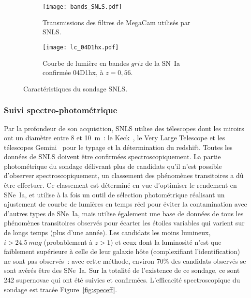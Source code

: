 \documentclass[../main/main.tex]{subfiles}
\begin{document}
\begin{figure}[ht]
    \centering
    \begin{subfigure}[]{.49\linewidth}
        \centering
        \texttt{[image: bands\_SNLS.pdf]}
        \captionsetup{justification=centering}
        \caption{Transmissions des filtres de MegaCam utilisés par SNLS.}
        \label{fig:snlsbands}
    \end{subfigure}
    \begin{subfigure}[]{.49\linewidth}
        \centering
        \texttt{[image: lc\_04D1hx.pdf]}
        \captionsetup{justification=centering}
        \caption{Courbe de lumière en bandes $griz$ de la SN~Ia confirmée
        04D1hx, à $z = 0,56$.}
        \label{fig:snlslc}
    \end{subfigure}
    \caption{Caractéristiques du sondage SNLS.}
\end{figure}

\subsubsection{Suivi spectro-photométrique}\label{sssec:snlsspectro}

Par la profondeur de son acquisition, SNLS utilise des télescopes dont les
miroirs ont un diamètre entre 8 et \SI{10}{m}~: le Keck~\citep{oke1995,
ellis2008}, le Very Large Telescope \citep[VLT,][]{balland2009} et les
télescopes Gemini~\citep{hook2004} pour le typage et la détermination du
redshift. Toutes les données de SNLS doivent être confirmées
spectroscopiquement. La partie photométrique du sondage délivrant plus de
candidats qu'il n'est possible d'observer spectroscopiquement, un classement des
phénomènes transitoires a dû être effectuer. Ce classement est déterminé en vue
d'optimiser le rendement en SNe~Ia, et utilise à la fois un outil de sélection
photométrique réalisant un ajustement de courbe de lumières en temps réel pour
éviter la contamination avec d'autres types de SNe~Ia, mais utilise également
une base de données de tous les phénomènes transitoires observés pour écarter
les étoiles variables qui varient sur de longs temps (plus d'une année). Les
candidats les moins lumineux, $i > \SI{24,5}{mag}$ (probablement à $z > 1$) et
ceux dont la luminosité n'est que faiblement supérieure à celle de leur galaxie
hôte (complexifiant l'identification) ne sont pas observés~: avec cette méthode,
environ 70\% des candidats observés se sont avérés être des SNe~Ia. Sur la
totalité de l'existence de ce sondage, ce sont 242 supernovae qui ont été
suivies et confirmées. L'efficacité spectroscopique du sondage est tracée
Figure~\ref{fig:speceff}.
\end{document}
